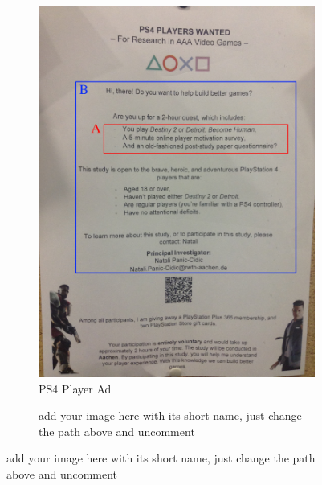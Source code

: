 \documentclass[a4paper,11pt,oneside]{scrreprt}
\begin{document}
\begin{figure}[H]
	\centering
	\begin{subfigure}{.5\textwidth}
		\centering
		\includegraphics[clip, trim=0cm 0cm 0cm 0cm, scale=0.13]{./images/recruitment2.jpeg}
		\caption{PS4 Player Ad}
	\end{subfigure}%
	\begin{subfigure}{.5\textwidth}
		\centering
		\caption{add your image here with its short name, just change the path above and uncomment}
	\end{subfigure}
	\label{fig:test}
\end{figure}
\end{document}
